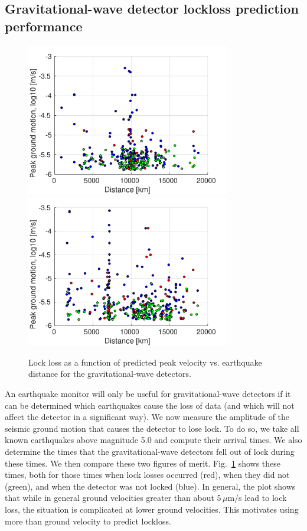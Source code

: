 \documentclass[reprint, prl, aps, showpacs]{revtex4-1}
\begin{document}
\subsection{Gravitational-wave detector lockloss prediction performance}

\begin{figure}[t]
\hspace*{-0.5cm}
 \includegraphics[width=3.5in]{lockloss_vel_distance_LHO.pdf}
  \includegraphics[width=3.5in]{lockloss_vel_distance_LLO.pdf}
 \caption{Lock loss as a function of predicted peak velocity vs. earthquake distance for the gravitational-wave detectors.}
 \label{fig:lockloss}
\end{figure}

An earthquake monitor will only be useful for gravitational-wave detectors if it can be determined which earthquakes cause the loss of data (and which will not affect the detector in a significant way).
We now measure the amplitude of the seismic ground motion that causes the detector to lose lock. To do so, we take all known earthquakes above magnitude 5.0 and compute their arrival times. 
We also determine the times that the gravitational-wave detectors fell out of lock during these times. 
We then compare these two figures of merit. 
Fig.~\ref{fig:lockloss} shows these times, both for those times when lock losses occurred (red), when they did not (green), and when the detector was not locked (blue). 
In general, the plot shows that while in general ground velocities greater than about 5\,$\mu$m/s lead to lock loss, the situation is complicated at lower ground velocities. This motivates using more than ground velocity to predict lockloss.
\end{document}
